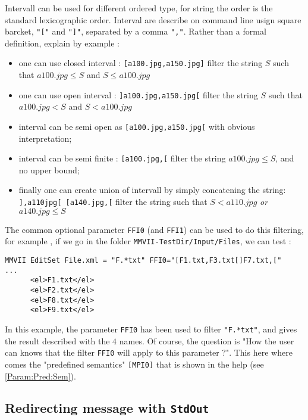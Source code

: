 Intervall can be used for different  ordered type, for string the order
is the standard lexicographic order. Interval are describe on command
line usign square barcket, {\tt "["} and  {\tt "]"}, separated by a comma {\tt ","}.
Rather than a formal definition, explain by example :

\begin{itemize}
   \item one can use closed interval : {\tt [a100.jpg,a150.jpg]} filter the string $S$ such that   $ a100.jpg \leq S $ and  $ S \leq a100.jpg $ 
   \item one can use open interval  : {\tt ]a100.jpg,a150.jpg[} filter the string $S$ such that   $ a100.jpg <  S $ and  $ S < a100.jpg $ 
   \item interval can be semi open as  {\tt [a100.jpg,a150.jpg[} with obvious interpretation;
   \item interval can be semi finite :  {\tt [a100.jpg,[} filter the string  $ a100.jpg \leq S $, and no upper bound;
   \item finally one can create union of intervall by simply concatening the string: {\tt  ],a110jpg[ [a140.jpg,[}
         filter the string such that  $ S < a110.jpg $ \emph{or}  $  a140.jpg \leq S $
       
\end{itemize}

The common optional parameter {\tt FFI0} (and {\tt FFI1}) can be used to do this filtering,
for example , if we go in the folder  {\tt {\MMVIDIR}MMVII-TestDir/Input/Files}, we can test :

\begin{verbatim}
MMVII EditSet File.xml = "F.*txt" FFI0="[F1.txt,F3.txt[]F7.txt,["
...
      <el>F1.txt</el>
      <el>F2.txt</el>
      <el>F8.txt</el>
      <el>F9.txt</el>
\end{verbatim}

In this example, the parameter {\tt FFI0} has been used to filter {\tt "F.*txt"},
and gives the result described with the $4$ names. Of course, the question is "How the user can knows that the
filter  {\tt FFI0}  will apply to this parameter ?".  This here where comes the
"predefined semantics"  {\tt [MPI0]} that is shown in the help (see \ref{Param:Pred:Sem}).


\subsection{Redirecting message with {\tt StdOut}}

